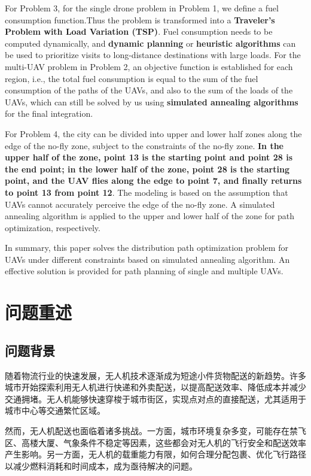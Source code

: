 \documentclass[a4paper]{article} %
\begin{document}
{    For Problem 3, for the single drone problem in Problem 1, we define a fuel consumption function.Thus the problem is transformed into a \textbf{Traveler's Problem with Load Variation (TSP)}. Fuel consumption needs to be computed dynamically, and \textbf{dynamic planning} or \textbf{heuristic algorithms} can be used to prioritize visits to long-distance destinations with large loads. For the multi-UAV problem in Problem 2, an objective function is established for each region, i.e., the total fuel consumption is equal to the sum of the fuel consumption of the paths of the UAVs, and also to the sum of the loads of the UAVs, which can still be solved by us using \textbf{simulated annealing algorithms} for the final integration.

    For Problem 4, the city can be divided into upper and lower half zones along the edge of the no-fly zone, subject to the constraints of the no-fly zone. \textbf{In the upper half of the zone, point 13 is the starting point and point 28 is the end point; in the lower half of the zone, point 28 is the starting point, and the UAV flies along the edge to point 7, and finally returns to point 13 from point 12}. The modeling is based on the assumption that UAVs cannot accurately perceive the edge of the no-fly zone. A simulated annealing algorithm is applied to the upper and lower half of the zone for path optimization, respectively.
    
In summary, this paper solves the distribution path optimization problem for UAVs under different constraints based on simulated annealing algorithm. An effective solution is provided for path planning of single and multiple UAVs.

\thispagestyle{empty}
    \newpage
    \clearpage
    \setcounter{page}{1}
    \section{问题重述}


    \subsection{问题背景}
    
    随着物流行业的快速发展，无人机技术逐渐成为短途小件货物配送的新趋势。许多城市开始探索利用无人机进行快递和外卖配送，以提高配送效率、降低成本并减少交通拥堵。无人机能够快速穿梭于城市街区，实现点对点的直接配送，尤其适用于城市中心等交通繁忙区域。

    
    然而，无人机配送也面临着诸多挑战。一方面，城市环境复杂多变，可能存在禁飞区、高楼大厦、气象条件不稳定等因素，这些都会对无人机的飞行安全和配送效率产生影响。另一方面，无人机的载重能力有限，如何合理分配包裹、优化飞行路径以减少燃料消耗和时间成本，成为亟待解决的问题。

}
\end{document}
